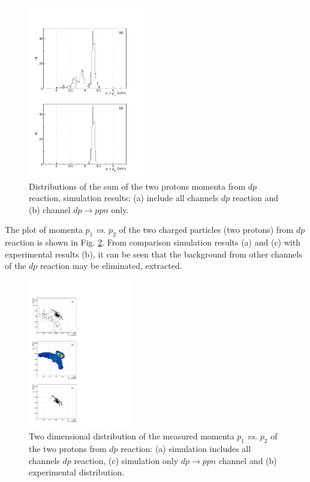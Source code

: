 \documentclass[twocolumn,epjc3]{svjour3}
\newcommand{\dpfrag} {\ensuremath{dp \rightarrow ppn}\xspace}
\begin{document}
\begin{figure}[h]
  \centering
  \includegraphics[width=0.48\textwidth]{p1_plus_p2_2.pdf}
  \caption{Distributions of the sum of the two protons momenta from $dp$
    reaction, simulation results: (a) include all channels $dp$ reaction and (b)
    channel \dpfrag only.}
  \label{fig:p1p2sim}
\end{figure}

The plot of momenta $p_1$ \textit{vs.} $p_2$ of the two charged particles (two
protons) from $dp$ reaction is shown in Fig. \ref{fig:p1vsp2}. From comparison
simulation results (a) and (c) with experimental results (b), it can be seen
that the background from other channels of the $dp$ reaction may be eliminated,
extracted.

\begin{figure}[t]
  \centering
  \includegraphics[width=0.41\textwidth]{p1_vs_p2_1.pdf} %
  \caption{Two dimensional distribution of the measured momenta $p_1$
    \textit{vs.} $p_2$ of the two protons from $dp$ reaction: (a) simulation
    includes all channels $dp$ reaction, (c) simulation only \dpfrag channel and
    (b) experimental distribution.}
  \label{fig:p1vsp2}
\end{figure}
\end{document}
